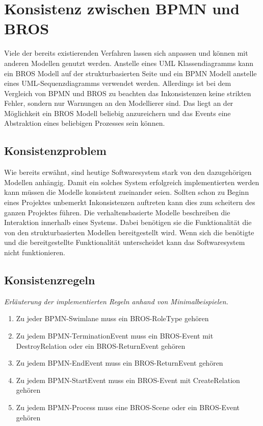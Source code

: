 \chapter{Konsistenz zwischen BPMN und BROS}

Viele der bereits existierenden Verfahren lassen sich anpassen und können mit anderen Modellen genutzt werden. 
Anstelle eines UML Klassendiagramms kann ein BROS Modell auf der strukturbasierten Seite und ein BPMN Modell anstelle eines UML-Sequenzdiagramms verwendet werden.
Allerdings ist bei dem Vergleich von BPMN und BROS zu beachten das Inkonsistenzen keine strikten Fehler, sondern nur Warnungen an den Modellierer sind.
Das liegt an der Möglichkeit ein BROS Modell beliebig anzureichern und das Events eine Abstraktion eines beliebigen Prozesses sein können.

\section{Konsistenzproblem}

Wie bereits erwähnt, sind heutige Softwaresystem stark von den dazugehörigen Modellen anhängig.
Damit ein solches System erfolgreich implementierten werden kann müssen die Modelle konsistent zueinander seien.
Sollten schon zu Beginn eines Projektes unbemerkt Inkonsistenzen auftreten kann dies zum scheitern des ganzen Projektes führen.
Die verhaltensbasierte Modelle beschreiben die Interaktion innerhalb eines Systems.
Dabei benötigen sie die Funktionalität die von den strukturbasierten Modellen bereitgestellt wird.
Wenn sich die benötigte und die bereitgestellte Funktionalität unterscheidet kann das Softwaresystem nicht funktionieren.

\section{Konsistenzregeln}

\textit{Erläuterung der implementierten Regeln anhand von Minimalbeispielen.}

\begin{enumerate}
    \item Zu jeder BPMN-Swimlane muss ein BROS-RoleType gehören
    \item Zu jedem BPMN-TerminationEvent muss ein BROS-Event mit DestroyRelation oder ein BROS-ReturnEvent gehören
    \item Zu jedem BPMN-EndEvent muss ein BROS-ReturnEvent gehören
    \item Zu jedem BPMN-StartEvent muss ein BROS-Event mit CreateRelation gehören
    \item Zu jedem BPMN-Process muss eine BROS-Scene oder ein BROS-Event gehören 
\end{enumerate}

